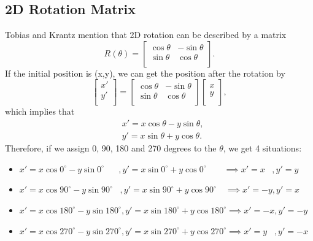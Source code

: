 \subsection{2D Rotation Matrix}
\label{section:2Drotationmatrix}
Tobias and Krantz \cite{r9} mention that 2D rotation can be described by a matrix
\begin{equation}
R(\theta)=\begin{bmatrix}
\cos\theta & -\sin\theta\\
\sin\theta & \cos\theta\\
\end{bmatrix}.
\end{equation}
If the initial position is (x,y), we can get the position after the rotation by
\begin{equation}
\begin{bmatrix}
x'\\
y'\\
\end{bmatrix}
=\begin{bmatrix}
\cos\theta & -\sin\theta\\
\sin\theta & \cos\theta\\
\end{bmatrix}
\begin{bmatrix}
x\\
y\\
\end{bmatrix},
\end{equation}
which implies that 
\begin{equation}
\begin{aligned}
&x'=x\cos\theta-y\sin\theta,\\
&y'=x\sin\theta+y\cos\theta.
\end{aligned}
\end{equation}
Therefore, if we assign 0, 90, 180 and 270 degrees to the $\theta$, we get 4 situations:
\begin{itemize}
  \item $x'=x\cos0^{\circ} - y\sin0^{\circ}\hspace{20pt},y'=x\sin0^{\circ} + y\cos0^{\circ}\hspace{24pt}\implies x'=x\hspace{10pt}, y'=y$
  \item $x'=x\cos90^{\circ} - y\sin90^{\circ}\hspace{10pt},y'=x\sin90^{\circ} + y\cos90^{\circ}\hspace{12pt}\implies x'=-y, y'=x$
  \item $x'=x\cos180^{\circ} - y\sin180^{\circ}, y'=x\sin180^{\circ} + y\cos180^{\circ} \implies x'=-x, y'=-y$
  \item $x'=x\cos270^{\circ} - y\sin270^{\circ}, y'=x\sin270^{\circ} + y\cos270^{\circ} \implies x'=y\hspace{10pt},y'=-x$
  \label{rotation4}
\end{itemize}
